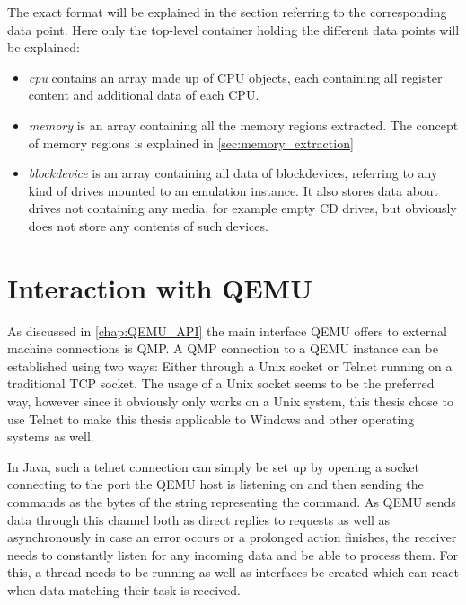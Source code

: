 The exact format will be explained in the section referring to the corresponding data point.
Here only the top-level container holding the different data points will be explained:
\begin{itemize}
    \item \emph{cpu} contains an array made up of CPU objects, each containing all register content and additional data of each CPU.
    \item \emph{memory} is an array containing all the memory regions extracted.
    The concept of memory regions is explained in \autoref{sec:memory_extraction}
    \item \emph{blockdevice} is an array containing all data of blockdevices,
    referring to any kind of drives mounted to an emulation instance.
    It also stores data about drives not containing any media, for example empty CD drives,
    but obviously does not store any contents of such devices.
\end{itemize}

\section{Interaction with QEMU}\label{sec:QEMU_Interaction}
As discussed in \autoref{chap:QEMU_API} the main interface QEMU offers to external machine connections is QMP.
A QMP connection to a QEMU instance can be established using two ways:
Either through a Unix socket or Telnet running on a traditional TCP socket.
The usage of a Unix socket seems to be the preferred way,
however since it obviously only works on a Unix system,
this thesis chose to use Telnet to make this thesis applicable
to Windows and other operating systems as well.

In Java, such a telnet connection can simply be set up by opening a socket connecting to the port the QEMU host is listening on
and then sending the commands as the bytes of the string representing the command.
As QEMU sends data through this channel both as direct replies to requests as well as asynchronously
in case an error occurs or a prolonged action finishes,
the receiver needs to constantly listen for any incoming data and be able to process them.
For this, a thread needs to be running as well as interfaces be created
which can react when data matching their task is received.

